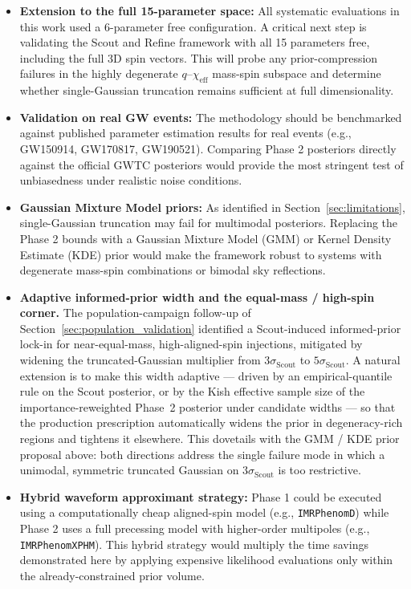 \documentclass[12pt]{article}
\begin{document}
\begin{itemize}
    \item \textbf{Extension to the full 15-parameter space:} All systematic evaluations in this work used a 6-parameter free configuration. A critical next step is validating the Scout and Refine framework with all 15 parameters free, including the full 3D spin vectors. This will probe any prior-compression failures in the highly degenerate $q$--$\chi_{\text{eff}}$ mass-spin subspace and determine whether single-Gaussian truncation remains sufficient at full dimensionality.

    \item \textbf{Validation on real GW events:} The methodology should be benchmarked against published parameter estimation results for real events (e.g., GW150914, GW170817, GW190521). Comparing Phase 2 posteriors directly against the official GWTC posteriors \cite{GWTC3} would provide the most stringent test of unbiasedness under realistic noise conditions.

    \item \textbf{Gaussian Mixture Model priors:} As identified in Section~\ref{sec:limitations}, single-Gaussian truncation may fail for multimodal posteriors. Replacing the Phase 2 bounds with a Gaussian Mixture Model (GMM) or Kernel Density Estimate (KDE) prior would make the framework robust to systems with degenerate mass-spin combinations or bimodal sky reflections.

    \item \textbf{Adaptive informed-prior width and the equal-mass / high-spin corner.} The population-campaign follow-up of Section~\ref{sec:population_validation} identified a Scout-induced informed-prior lock-in for near-equal-mass, high-aligned-spin injections, mitigated by widening the truncated-Gaussian multiplier from $3\sigma_{\mathrm{Scout}}$ to $5\sigma_{\mathrm{Scout}}$. A natural extension is to make this width adaptive --- driven by an empirical-quantile rule on the Scout posterior, or by the Kish effective sample size of the importance-reweighted Phase~2 posterior under candidate widths --- so that the production prescription automatically widens the prior in degeneracy-rich regions and tightens it elsewhere. This dovetails with the GMM / KDE prior proposal above: both directions address the single failure mode in which a unimodal, symmetric truncated Gaussian on $3\sigma_{\mathrm{Scout}}$ is too restrictive.

    \item \textbf{Hybrid waveform approximant strategy:} Phase 1 could be executed using a computationally cheap aligned-spin model (e.g., \texttt{IMRPhenomD}) while Phase 2 uses a full precessing model with higher-order multipoles (e.g., \texttt{IMRPhenomXPHM}). This hybrid strategy would multiply the time savings demonstrated here by applying expensive likelihood evaluations only within the already-constrained prior volume.


\end{itemize}
\end{document}
